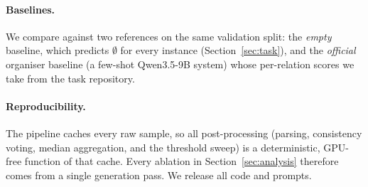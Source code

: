\paragraph{Baselines.}
We compare against two references on the same validation split: the \emph{empty}
baseline, which predicts $\emptyset$ for every instance (Section~\ref{sec:task}),
and the \emph{official} organiser baseline (a few-shot Qwen3.5-9B system) whose
per-relation scores we take from the task repository.

\paragraph{Reproducibility.}
The pipeline caches every raw sample, so all post-processing (parsing, consistency
voting, median aggregation, and the threshold sweep) is a deterministic, GPU-free
function of that cache. Every ablation in Section~\ref{sec:analysis} therefore
comes from a single generation pass. We release all code and prompts.
